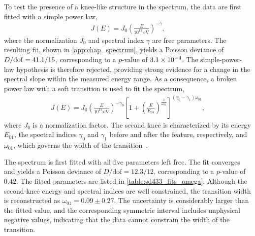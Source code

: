 \documentclass[main.tex]{subfiles}
\begin{document}
To test the presence of a knee-like structure in the spectrum, the data are first fitted with a simple power law,
\begin{align}
    J(E)
    =
    J_0
    \left(
        \frac{E}{10^{17}\,\mathrm{eV}}
    \right)^{-\gamma},
\end{align}
\noindent where the normalization $J_0$ and spectral index $\gamma$ are free parameters.
The resulting fit, shown in \cref{app:chap_spectrum}, yields a Poisson deviance of
$D/\mathrm{dof}=\num{41.1}/\num{15}$,
corresponding to a $p$-value of $\num{3.1e-4}$.
The simple-power-law hypothesis is therefore rejected, providing strong evidence for a change in the spectral slope within the measured energy range.
As a consequence, a broken power law with a soft transition is used to fit the spectrum,
\begin{align}
    J(E)=J_0\left(
    \frac{E}{10^{17}\,\mathrm{eV}}
    \right)^{-\gamma_0}
    \left[
    1+\left(
    \frac{E}{E_{01}}
    \right)^{\frac{1}{\omega_{01}}}
    \right]^{(\gamma_0-\gamma_1)\omega_{01}},
    \label{eq:bplwst}
\end{align}
where $J_0$ is a normalization factor.
The second knee is characterized by its energy $E_{01}$, the spectral indices $\gamma_0$ and $\gamma_1$ before and after the feature, respectively, and $\omega_{01}$, which governs the width of the transition~\cite{PierreAuger:2021:InfillSpectrum}.

The spectrum is first fitted with all five parameters left free.
The fit converges and yields a Poisson deviance of
$D/\mathrm{dof}=12.3/12$, corresponding to a $p$-value of $0.42$.
The fitted parameters are listed in \cref{table:sd433_fits_omega}.
Although the second-knee energy and spectral indices are well constrained, the transition width is reconstructed as
$\omega_{01}=0.09\pm0.27$.
The uncertainty is considerably larger than the fitted value, and the corresponding symmetric interval includes unphysical negative values, indicating that the  data cannot constrain the width of the transition.
\end{document}
